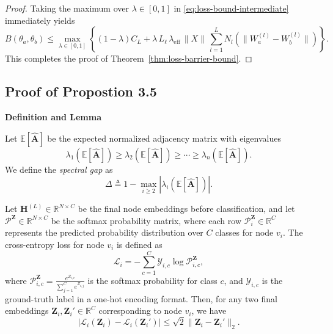 \begin{proof}
Taking the maximum over \(\lambda\in[0,1]\) in \eqref{eq:loss-bound-intermediate} immediately yields
\[
B(\theta_a,\theta_b) \le \max_{\lambda \in [0,1]} \left\{ (1-\lambda) C_L + \lambda\,L_\ell\,\lambda_{\mathrm{eff}}\,\|X\|\,\sum_{l=1}^{L} N_l \left( \|W_a^{(l)}-W_b^{(l)}\|\right) \right\}.
\]
This completes the proof of Theorem~\ref{thm:loss-barrier-bound}.
\end{proof}
\subsection{Proof of Propostion 3.5}\label{pro:3.5}
\noindent \textbf{Definition and Lemma}
\begin{definition}
\label{def:spectral-gap}
Let \(\mathbb{E}[\hat{\mathbf{A}}]\) be the expected normalized adjacency matrix with eigenvalues
\[
\lambda_1(\mathbb{E}[\hat{\mathbf{A}}]) \ge \lambda_2(\mathbb{E}[\hat{\mathbf{A}}]) \ge \cdots \ge \lambda_n(\mathbb{E}[\hat{\mathbf{A}}]).
\]
We define the \emph{spectral gap} as
\[
\Delta \triangleq 1 - \max_{i\ge 2} |\lambda_i(\mathbb{E}[\hat{\mathbf{A}}])|.
\]
\end{definition}
\begin{lemma}\label{cross_entropy}
Let $\mathbf{H}^{(L)} \in \mathbb{R}^{N \times C}$ be the final node embeddings before classification, and let $\mathcal{P}^{\mathbf{Z}} \in \mathbb{R}^{N \times C}$ be the softmax probability matrix, where each row $\mathcal{P}_i^{\mathbf{Z}} \in \mathbb{R}^{C}$ represents the predicted probability distribution over $C$ classes for node $v_i$. The cross-entropy loss for node $v_i$ is defined as
\begin{equation}
    \mathcal{L}_i = - \sum_{c=1}^{C} \mathcal{Y}_{i,c} \log \mathcal{P}_{i,c}^{\mathbf{Z}},
\end{equation}
where $\mathcal{P}_{i,c}^{\mathbf{Z}} = \frac{e^{Z_{i,c}}}{\sum_{j=1}^{C} e^{Z_{i,j}}}$ is the softmax probability for class $c$, and $\mathcal{Y}_{i,c}$ is the ground-truth label in a one-hot encoding format. Then, for any two final embeddings $\mathbf{Z}_i, \mathbf{Z}_i' \in \mathbb{R}^{C}$ corresponding to node $v_i$, we have
\begin{equation}
    | \mathcal{L}_i(\mathbf{Z}_i) - \mathcal{L}_i(\mathbf{Z}_i') | \leq \sqrt{2} \| \mathbf{Z}_i - \mathbf{Z}_i' \|_2.
\end{equation}
\end{lemma}

